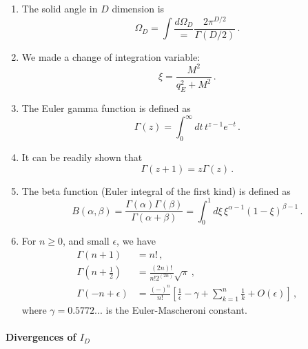\begin{enumerate}
\item The solid angle in $D$ dimension is
  \begin{equation}
    \label{eq:SoliAngleDDim}
    \Omega_D = \int \frac{d\Omega_D} =
    \frac{2\pi^{D/2}}{\Gamma(D/2)}\, .
  \end{equation}
\item We made a change of integration variable:
  \begin{equation}
    \label{eq:IntegVarChange}
    \xi = \frac{M^2}{q_E^2+M^2}\, .
  \end{equation}
\item The Euler gamma function is defined as
  \begin{equation}
    \label{eq:GammaFunDef}
    \Gamma(z) = \int_0^\infty dt\, t^{z-1} e^{-t}\, .
  \end{equation}
\item It can be readily shown that
  \begin{equation}
    \label{eq:GammRec}
    \Gamma(z+1) = z \Gamma(z)\, .
  \end{equation}
\item The beta function (Euler integral of the first kind) is defined
  as
  \begin{equation}
    \label{eq:BetaFunDef}
    B(\alpha,\beta) = \frac{\Gamma(\alpha)
      \Gamma(\beta)}{\Gamma(\alpha+\beta)} =
    \int_0^1 d\xi\, \xi^{\alpha-1} \left(1-\xi\right)^{\beta-1}\, .
  \end{equation}
\item For $n\geq 0$, and small $\epsilon$, we have
  \begin{align}
    \Gamma(n+1) &= n! \, , \\
    \Gamma\left(n+\frac12\right) &= \frac{(2n)!}{n!2^{(2n)}}
                                   \sqrt{\pi}\, , \\
    \Gamma(-n+\epsilon) &= \frac{(-)^n}{n!} \left[
                          \frac{1}{\epsilon} - \gamma + \sum_{k=1}^n
                          \frac{1}{k} + O(\epsilon)
                          \right]\, ,
  \end{align}
  where $\gamma=0.5772...$ is the Euler-Mascheroni constant. 
\end{enumerate}

\paragraph{Divergences of $I_D$}

